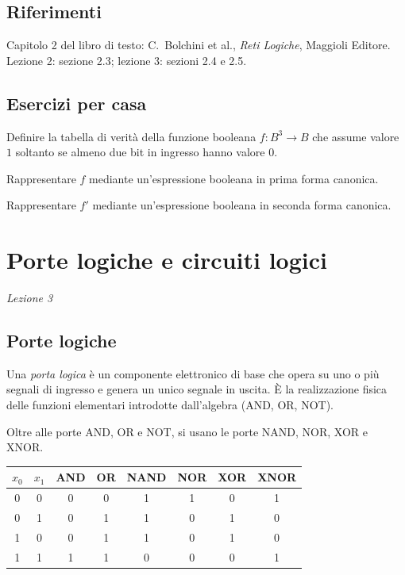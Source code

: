 \documentclass[11pt,a4paper]{article}
\begin{document}
\subsection*{Riferimenti}

Capitolo 2 del libro di testo: C.\ Bolchini et al., \emph{Reti Logiche},
Maggioli Editore. Lezione 2: sezione 2.3; lezione 3: sezioni 2.4 e 2.5.

\subsection*{Esercizi per casa}

\begin{esercizio}
Definire la tabella di verità della funzione booleana $f \colon B^3 \to B$ che
assume valore $1$ soltanto se almeno due bit in ingresso hanno valore $0$.
\end{esercizio}
\begin{esercizio}
Rappresentare $f$ mediante un'espressione booleana in prima forma canonica.
\end{esercizio}
\begin{esercizio}
Rappresentare $f'$ mediante un'espressione booleana in seconda forma canonica.
\end{esercizio}

\section[Porte logiche e circuiti logici (Lezione 3)]{Porte logiche e circuiti logici}
\noindent\emph{Lezione 3}
\subsection{Porte logiche}

\begin{definizione}
Una \emph{porta logica} è un componente elettronico di base che opera su uno o più segnali di ingresso e genera un unico segnale in uscita. È la realizzazione fisica delle funzioni elementari introdotte dall'algebra (AND, OR, NOT).
\end{definizione}

Oltre alle porte AND, OR e NOT, si usano le porte NAND, NOR, XOR e XNOR.

\begin{center}
\begin{tabular}{cc|cccccc}
\toprule
$x_0$ & $x_1$ & AND & OR & NAND & NOR & XOR & XNOR \\
\midrule
0 & 0 & 0 & 0 & 1 & 1 & 0 & 1 \\
0 & 1 & 0 & 1 & 1 & 0 & 1 & 0 \\
1 & 0 & 0 & 1 & 1 & 0 & 1 & 0 \\
1 & 1 & 1 & 1 & 0 & 0 & 0 & 1 \\
\bottomrule
\end{tabular}
\end{center}
\end{document}
